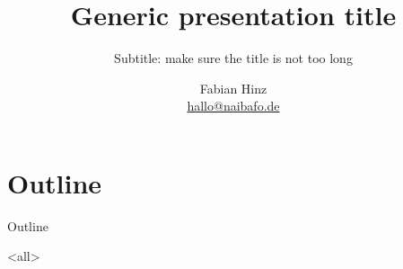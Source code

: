 \documentclass[ignorenonframetext,hyperref={colorlinks=true}]{beamer} %
\title{Generic presentation title}
\subtitle{Subtitle: make sure the title is not too long}
\author[Fabian Hinz]{Fabian Hinz \\ {\ttfamily\small \href{mailto:hallo@naibafo.de}{hallo@naibafo.de}}}
\institute{\href{https://www.naibafo.de}{Organisation/Homepage}}
\date[April 16, 2015]
\begin{document}
\maketitle

\begin{abstract}
\end{abstract}

\begin{frame}
  \titlepage{}
\end{frame}

\section*{Outline}

\begin{frame}{Outline}
  \tableofcontents[subsectionstyle=hide]
\end{frame}

\mode<all>{}
\end{document}
